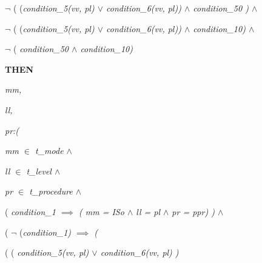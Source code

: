 \documentclass[11pt]{article}
\begin{document}
\begin{sloppypar}
\hspace*{0.40in}\hspace*{0.40in}\hspace*{0.60in} $\neg$  \rm ( \rm (\it condition\_5\rm (\it vv\rm , \it pl\rm )  $\lor$  \it condition\_6\rm (\it vv\rm , \it pl\rm )\rm )  $\land$  \it condition\_50 \rm )  $\land$ 

\hspace*{0.40in}\hspace*{0.40in} $\neg$ \rm ( \rm (\it condition\_5\rm (\it vv\rm , \it pl\rm )  $\lor$  \it condition\_6\rm (\it vv\rm , \it pl\rm )\rm )  $\land$  \it condition\_10\hspace*{0.10in}\rm )  $\land$ 

\hspace*{0.40in}\hspace*{0.40in} $\neg$ \rm ( \it condition\_50  $\land$  \it condition\_10\hspace*{0.10in}\rm )

\vspace*{4mm}
\hspace*{0.20in}\bf THEN

\hspace*{0.40in}\it mm\rm ,

\hspace*{0.40in}\it ll\rm , 

\hspace*{0.40in}\it pr\hspace*{0.10in}\rm :\rm (

\hspace*{0.60in}\hspace*{0.60in}\it mm  $\in$  \it t\_mode  $\land$ 

\hspace*{0.60in}\it ll  $\in$  \it t\_level  $\land$ 

\hspace*{0.60in}\it pr  $\in$  \it t\_procedure  $\land$ 

\hspace*{0.60in}

\hspace*{0.60in}\rm ( \it condition\_1\hspace*{0.10in} $\implies$  \rm ( \it mm \rm = \it ISo  $\land$  \it ll \rm = \it pl  $\land$  \it pr \rm = \it ppr\rm ) \rm )  $\land$ 

\hspace*{0.60in}\rm (  $\neg$ \rm (\it condition\_1\rm )  $\implies$  \rm (

\hspace*{0.80in}\hspace*{0.80in}\rm ( \rm ( \it condition\_5\rm (\it vv\rm , \it pl\rm )  $\lor$  \it condition\_6\rm (\it vv\rm , \it pl\rm ) \rm )\hspace*{0.25in}


\end{sloppypar}
\end{document}
